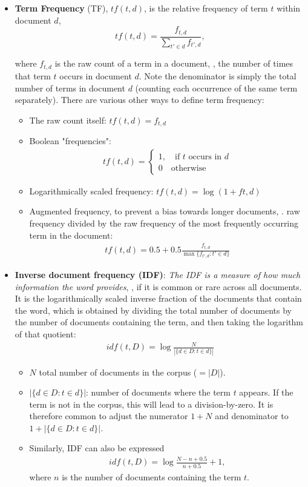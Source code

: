\begin{itemize}
	\item \textbf{Term Frequency} (TF), $tf(t,d)$, is the relative frequency of term $t$ within document $d$,
		$$tf(t,d) = \frac{f_{t,d}}{\sum_{t'\in d}f_{t',d}},$$

		where $f_{t,d}$ is the raw count of a term in a document, \ie, the number of times that term $t$ occurs in document $d$. Note the denominator is simply the total number of terms in document $d$ (counting each occurrence of the same term separately). There are various other ways to define term frequency:
		\begin{itemize}
			\item The raw count itself: $tf(t,d) = f_{t,d}$ 
    		\item Boolean "frequencies": 
				\begin{align*}
					tf(t,d) = \begin{cases}
						1, \quad \text{if $t$ occurs in $d$}\\
						0 \quad \text{otherwise}
							\end{cases}
				\end{align*}
    		\item Logarithmically scaled frequency: $tf(t,d) = \log (1 + ft,d)$
    		\item Augmented frequency, to prevent a bias towards longer documents, \eg. raw frequency divided by the raw frequency of the most frequently occurring term in the document:
				\begin{align*}
					tf(t,d) = 0.5 + 0.5\frac{f_{t,d}}{\max \{f_{t',d}:t' \in d\}}
				\end{align*}
		\end{itemize}
	\item \textbf{Inverse document frequency (IDF)}: \textit{The IDF is a measure of how much information the word provides}, \ie, if it is common or rare across all documents. It is the logarithmically scaled inverse fraction of the documents that contain the word, which is obtained by dividing the total number of documents by the number of documents containing the term, and then taking the logarithm of that quotient: 
		\begin{align*}
			idf(t, D) = \log \frac{N}{|\{d\in D: t\in d\}|}
		\end{align*}
		\begin{itemize}
			\item $N$ total number of documents in the corpus ($=|D|$). 
			\item $|\{d\in D: t\in d\}|$: number of documents where the term $t$ appears. If the term is not in the corpus, this will lead to a division-by-zero. It is therefore common to adjust the numerator $1 + N$ and denominator to $1+|\{d\in D: t\in d\}|$.
			\item Similarly, IDF can also be expressed
		\begin{align*}
			idf(t, D) = \log \frac{N-n+0.5}{n+0.5}+1,
		\end{align*}
		where $n$ is the number of documents containing the term $t$.
		\end{itemize}

\end{itemize}

